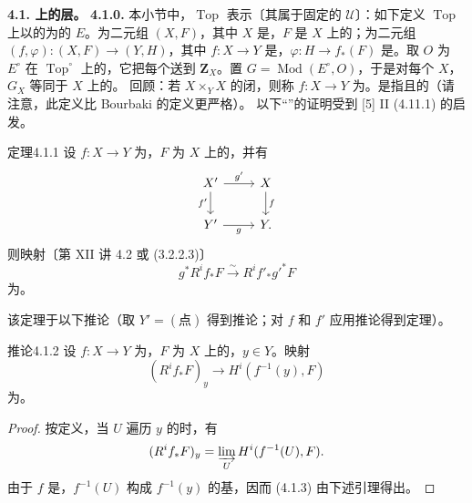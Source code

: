 \textbf{4.1. 上的层。}
\textbf{4.1.0.} 本小节中，$\operatorname{Top}$ 表示〔其属于固定的 $\mathcal U$〕：如下定义 $\operatorname{Top}$ 上以的为的 $E$。为二元组 $(X,F)$，其中 $X$ 是，$F$ 是 $X$ 上的；为二元组 $(f,\varphi):(X,F)\to(Y,H)$，其中 $f:X\to Y$ 是，$\varphi:H\to f_*(F)$ 是。取 $O$ 为 $E^\circ$ 在 $\operatorname{Top}^\circ$ 上的，它把每个送到 $\mathbf Z_X$。置 $G=\operatorname{Mod}(E^\circ,O)$，于是对每个 $X$，$G_X$ 等同于 $X$ 上的。
回顾：若 $X\times_Y X$ 的闭，则称 $f:X\to Y$ 为。是指且的（请注意，此定义比 Bourbaki 的定义更严格）。
以下“”的证明受到 [5] II (4.11.1) 的启发。
\begin{SGAresult}{定理}{4.1.1}
设 $f:X\to Y$ 为，$F$ 为 $X$ 上的，并有
\[
\begin{tikzcd}
X'\arrow[r,"g'"]\arrow[d,"f'"']&X\arrow[d,"f"]\\
Y'\arrow[r,"g"']&Y.
\end{tikzcd}
\]
则映射〔第 XII 讲 4.2 或 (3.2.2.3)〕
\[
g^*R^if_*F\xrightarrow{\sim}R^if'_*g'^*F
\]
为。
\end{SGAresult}
该定理于以下推论（取 $Y'=(\text{点})$ 得到推论；对 $f$ 和 $f'$ 应用推论得到定理）。
\begin{SGAresult}{推论}{4.1.2}
设 $f:X\to Y$ 为，$F$ 为 $X$ 上的，$y\in Y$。映射
\[
(R^if_*F)_y\longrightarrow H^i(f^{-1}(y),F)
\]
为。
\end{SGAresult}
\begin{proof}
按定义，当 $U$ 遍历 $y$ 的时，有
\[
(R^if_*F)_y=\varinjlim_U H^i(f^{-1}(U),F).
\]
由于 $f$ 是，$f^{-1}(U)$ 构成 $f^{-1}(y)$ 的基，因而 (4.1.3) 由下述引理得出。
\end{proof}
